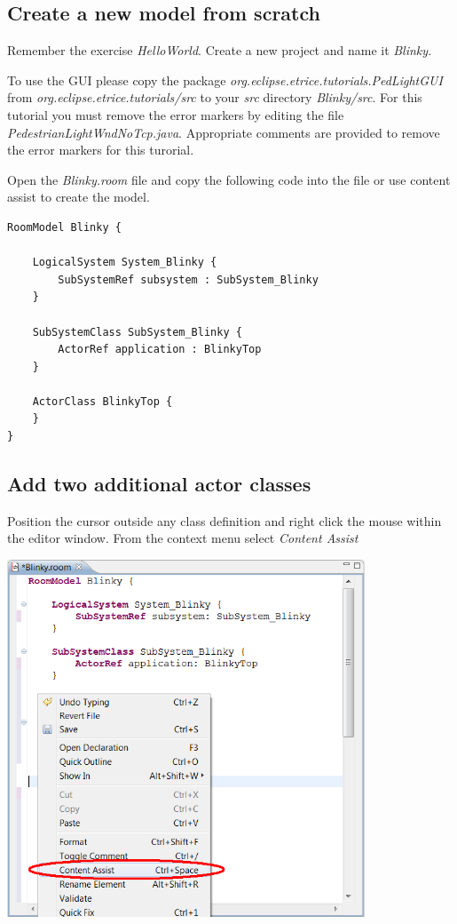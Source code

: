\subsection{Create a new model from scratch}

Remember the exercise \textit{HelloWorld}.
Create a new \eTrice{} project and name it \textit{Blinky}.

To use the GUI please copy the package \textit{org.eclipse.etrice.tutorials.PedLightGUI} from 
\textit{org.eclipse.etrice.tutorials/src} to your \emph{src} directory \textit{Blinky/src}. For this tutorial 
you must remove the error markers by editing the file \textit{PedestrianLightWndNoTcp.java}. Appropriate 
comments are provided to remove the error markers for this turorial.

Open the \textit{Blinky.room} file and copy the following code into the file or use content assist to 
create the model.

\begin{verbatim} 
RoomModel Blinky {

    LogicalSystem System_Blinky {
        SubSystemRef subsystem : SubSystem_Blinky
    }

    SubSystemClass SubSystem_Blinky {
        ActorRef application : BlinkyTop
    }

    ActorClass BlinkyTop {
    }
}
\end{verbatim}

\subsection{Add two additional actor classes}

Position the cursor outside any class definition and right click the mouse within the editor window. From 
the context menu select \textit{Content Assist}  

\includegraphics[width=0.8\textwidth]{images/020-Blinky02.png}


